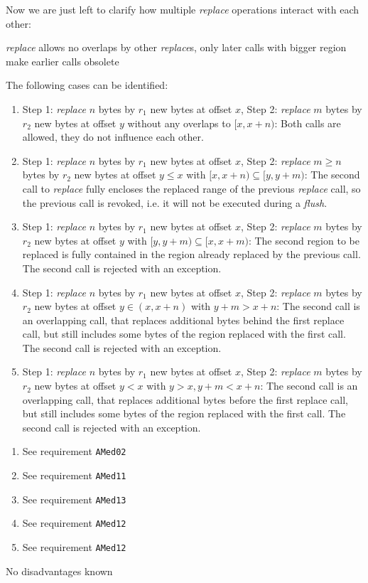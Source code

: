Now we are just left to clarify how multiple \emph{replace} operations interact with each other:

{%
\emph{replace} allows no overlaps by other \emph{replace}s, only later calls with bigger region make earlier calls obsolete
}
{%
The following cases can be identified:
\begin{enumerate}
\item Step 1: \emph{replace} $n$ bytes by $r_{1}$ new bytes at offset $x$, Step 2: \emph{replace} $m$ bytes by $r_{2}$ new bytes at offset $y$ without any overlaps to $[x,x+n)$: Both calls are allowed, they do not influence each other.
\item Step 1: \emph{replace} $n$ bytes by $r_{1}$ new bytes at offset $x$, Step 2: \emph{replace} $m\geq n$ bytes by $r_{2}$ new bytes at offset $y\leq x$ with $[x,x+n)\subseteq [y,y+m)$: The second call to \emph{replace} fully encloses the replaced range of the previous \emph{replace} call, so the previous call is revoked, i.e. it will not be executed during a \emph{flush}.
\item Step 1: \emph{replace} $n$ bytes by $r_{1}$ new bytes at offset $x$, Step 2: \emph{replace} $m$ bytes by $r_{2}$ new bytes at offset $y$ with $[y,y+m)\subseteq [x,x+m)$: The second region to be replaced is fully contained in the region already replaced by the previous call. The second call is rejected with an exception.
\item Step 1: \emph{replace} $n$ bytes by $r_{1}$ new bytes at offset $x$, Step 2: \emph{replace} $m$ bytes by $r_{2}$ new bytes at offset $y\in (x,x+n)$ with $y+m>x+n$: The second call is an overlapping call, that replaces additional bytes behind the first replace call, but still includes some bytes of the region replaced with the first call. The second call is rejected with an exception.
\item Step 1: \emph{replace} $n$ bytes by $r_{1}$ new bytes at offset $x$, Step 2: \emph{replace} $m$ bytes by $r_{2}$ new bytes at offset $y<x$ with $y>x, y+m<x+n$: The second call is an overlapping call, that replaces additional bytes before the first replace call, but still includes some bytes of the region replaced with the first call. The second call is rejected with an exception.
\end{enumerate}
}
{%
\begin{enumerate}
\item See requirement \texttt{AMed02}
\item See requirement \texttt{AMed11}
\item See requirement \texttt{AMed13}
\item See requirement \texttt{AMed12}
\item See requirement \texttt{AMed12}
\end{enumerate}
}
{%
No disadvantages known
}

